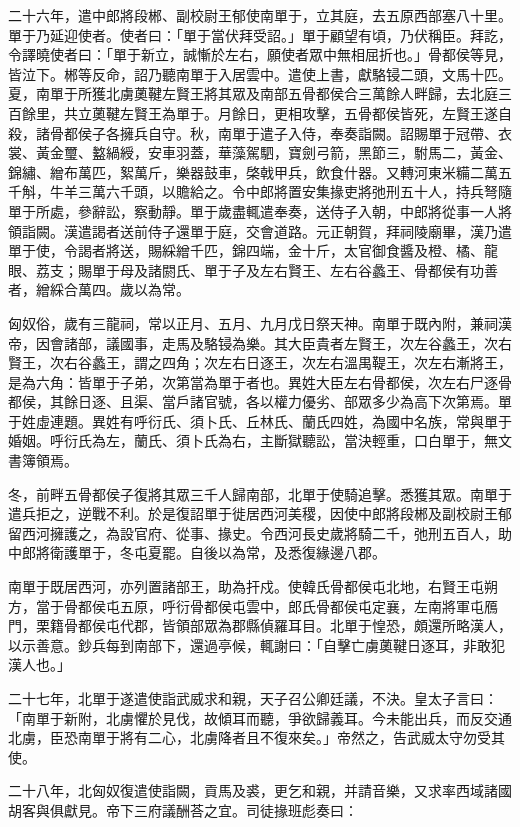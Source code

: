 \begin{pinyinscope}
二十六年，遣中郎將段郴、副校尉王郁使南單于，立其庭，去五原西部塞八十里。單于乃延迎使者。使者曰：「單于當伏拜受詔。」單于顧望有頃，乃伏稱臣。拜訖，令譯曉使者曰：「單于新立，誠慚於左右，願使者眾中無相屈折也。」骨都侯等見，皆泣下。郴等反命，詔乃聽南單于入居雲中。遣使上書，獻駱锓二頭，文馬十匹。夏，南單于所獲北虜薁鞬左賢王將其眾及南部五骨都侯合三萬餘人畔歸，去北庭三百餘里，共立薁鞬左賢王為單于。月餘日，更相攻擊，五骨都侯皆死，左賢王遂自殺，諸骨都侯子各擁兵自守。秋，南單于遣子入侍，奉奏詣闕。詔賜單于冠帶、衣裳、黃金璽、盭緺綬，安車羽蓋，華藻駕駟，寶劍弓箭，黑節三，駙馬二，黃金、錦繡、繒布萬匹，絮萬斤，樂器鼓車，棨戟甲兵，飲食什器。又轉河東米糒二萬五千斛，牛羊三萬六千頭，以贍給之。令中郎將置安集掾吏將弛刑五十人，持兵弩隨單于所處，參辭訟，察動靜。單于歲盡輒遣奉奏，送侍子入朝，中郎將從事一人將領詣闕。漢遣謁者送前侍子還單于庭，交會道路。元正朝賀，拜祠陵廟畢，漢乃遣單于使，令謁者將送，賜綵繒千匹，錦四端，金十斤，太官御食醬及橙、橘、龍眼、荔支；賜單于母及諸閼氏、單于子及左右賢王、左右谷蠡王、骨都侯有功善者，繒綵合萬四。歲以為常。

匈奴俗，歲有三龍祠，常以正月、五月、九月戊日祭天神。南單于既內附，兼祠漢帝，因會諸部，議國事，走馬及駱锓為樂。其大臣貴者左賢王，次左谷蠡王，次右賢王，次右谷蠡王，謂之四角；次左右日逐王，次左右溫禺鞮王，次左右漸將王，是為六角：皆單于子弟，次第當為單于者也。異姓大臣左右骨都侯，次左右尸逐骨都侯，其餘日逐、且渠、當戶諸官號，各以權力優劣、部眾多少為高下次第焉。單于姓虛連題。異姓有呼衍氏、須卜氏、丘林氏、蘭氏四姓，為國中名族，常與單于婚姻。呼衍氏為左，蘭氏、須卜氏為右，主斷獄聽訟，當決輕重，口白單于，無文書簿領焉。

冬，前畔五骨都侯子復將其眾三千人歸南部，北單于使騎追擊。悉獲其眾。南單于遣兵拒之，逆戰不利。於是復詔單于徙居西河美稷，因使中郎將段郴及副校尉王郁留西河擁護之，為設官府、從事、掾史。令西河長史歲將騎二千，弛刑五百人，助中郎將衛護單于，冬屯夏罷。自後以為常，及悉復緣邊八郡。

南單于既居西河，亦列置諸部王，助為扞戍。使韓氏骨都侯屯北地，右賢王屯朔方，當于骨都侯屯五原，呼衍骨都侯屯雲中，郎氏骨都侯屯定襄，左南將軍屯鴈門，栗籍骨都侯屯代郡，皆領部眾為郡縣偵羅耳目。北單于惶恐，頗還所略漢人，以示善意。鈔兵每到南部下，還過亭候，輒謝曰：「自擊亡虜薁鞬日逐耳，非敢犯漢人也。」

二十七年，北單于遂遣使詣武威求和親，天子召公卿廷議，不決。皇太子言曰：「南單于新附，北虜懼於見伐，故傾耳而聽，爭欲歸義耳。今未能出兵，而反交通北虜，臣恐南單于將有二心，北虜降者且不復來矣。」帝然之，告武威太守勿受其使。

二十八年，北匈奴復遣使詣闕，貢馬及裘，更乞和親，并請音樂，又求率西域諸國胡客與俱獻見。帝下三府議酬荅之宜。司徒掾班彪奏曰：


\end{pinyinscope}
